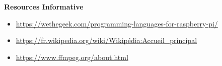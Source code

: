 \begin{thebibliography}{9}
    \textbf{Resources Informative}
    \begin{itemize}
        \item \footnotesize{\url{https://wethegeek.com/programming-languages-for-raspberry-pi/}}
        \item \footnotesize{\url{https://fr.wikipedia.org/wiki/Wikipédia:Accueil_principal}}
        \item \footnotesize{\url{https://www.ffmpeg.org/about.html}}
    \end{itemize}
    
\end{thebibliography}